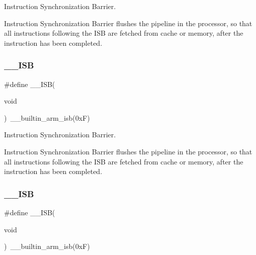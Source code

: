 Instruction Synchronization Barrier. 

Instruction Synchronization Barrier flushes the pipeline in the processor, so that all instructions following the I\+SB are fetched from cache or memory, after the instruction has been completed. \mbox{\label{group___c_m_s_i_s___core___instruction_interface_gaad233022e850a009fc6f7602be1182f6}} 
\subsubsection{\texorpdfstring{\_\_ISB}{\_\_ISB}\hspace{0.1cm}{\footnotesize\ttfamily [2/3]}}
{\footnotesize\ttfamily \#define \+\_\+\+\_\+\+I\+SB(\begin{DoxyParamCaption}\item[{}]{void }\end{DoxyParamCaption})~\+\_\+\+\_\+builtin\+\_\+arm\+\_\+isb(0x\+F)}



Instruction Synchronization Barrier. 

Instruction Synchronization Barrier flushes the pipeline in the processor, so that all instructions following the I\+SB are fetched from cache or memory, after the instruction has been completed. \mbox{\label{group___c_m_s_i_s___core___instruction_interface_gaad233022e850a009fc6f7602be1182f6}} 
\subsubsection{\texorpdfstring{\_\_ISB}{\_\_ISB}\hspace{0.1cm}{\footnotesize\ttfamily [3/3]}}
{\footnotesize\ttfamily \#define \+\_\+\+\_\+\+I\+SB(\begin{DoxyParamCaption}\item[{}]{void }\end{DoxyParamCaption})~\+\_\+\+\_\+builtin\+\_\+arm\+\_\+isb(0x\+F)}




